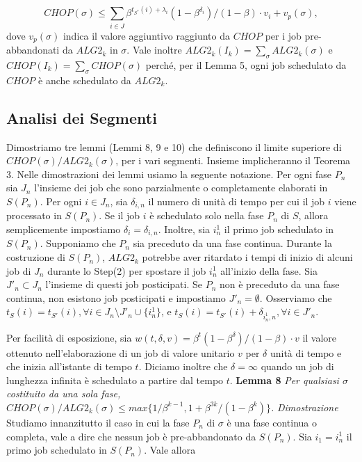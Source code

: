 \documentclass[twoside,openany,titlepage,fleqn,
	headinclude,12pt,a4paper,BCOR5mm,footinclude]{scrbook}
\begin{document}
$$CHOP(\sigma) \leq \sum_{i \in J} \beta^{t_{S^{*}}(i)+\lambda_{i}} (1 - \beta^{\delta_{i}})/(1 - \beta) \cdot v_{i} + v_{p}(\sigma),$$
dove $v_{p}(\sigma)$ indica il valore aggiuntivo raggiunto da $CHOP$ per i job pre-abbandonati da $ALG2_{k}$ in $\sigma$. Vale inoltre $ALG2_{k}(I_{k}) = \sum_{\sigma} ALG2_{k}(\sigma)$ e $CHOP(I_{k}) =\sum_{\sigma}CHOP(\sigma)$ perché, per il Lemma 5, ogni job schedulato da $CHOP$ è anche schedulato da $ALG2_{k}$.

\subsection{Analisi dei Segmenti}
Dimostriamo tre lemmi (Lemmi 8, 9 e 10) che definiscono il limite superiore di $CHOP(\sigma)/ALG2_{k}(\sigma)$, per i vari segmenti. Insieme implicheranno il Teorema 3. Nelle dimostrazioni dei lemmi usiamo la seguente notazione. Per ogni fase $P_{n}$ sia $J_{n}$ l'insieme dei job che sono parzialmente o completamente elaborati in $S(P_{n})$. Per ogni $i \in J_{n}$, sia $\delta_{i,n}$ il numero di unità di tempo per cui il job $i$ viene processato in $S(P_{n})$. Se il job $i$ è schedulato solo nella fase $P_{n}$ di $S$, allora semplicemente impostiamo $\delta_{i} = \delta_{i,n}$. Inoltre, sia $i^{1}_{n}$ il primo job schedulato in $S(P_{n})$. Supponiamo che $P_{n}$ sia preceduto da una fase continua. Durante la costruzione di $S(P_{n})$, $ALG2_{k}$ potrebbe aver ritardato i tempi di inizio di alcuni job di $J_{n}$ durante lo Step(2) per spostare il job $i^{1}_{n}$ all'inizio della fase. Sia $J'_{n} \subset J_{n}$ l'insieme di questi job posticipati. Se $P_{n}$ non è preceduto da una fase continua, non esistono job posticipati e impostiamo $J'_{n} = \emptyset$. Osserviamo che $t_{S}(i) = t_{S'}(i), \forall i \in J_{n} \setminus J'_{n} \cup \{i^{1}_{n}\}$, e $t_{S}(i) = t_{S'}(i) + \delta_{i^{1}_{n},n}, \forall i \in J'_{n}$.

Per facilità di esposizione, sia $w(t, \delta, v) = \beta^{t} (1 - \beta^{\delta}) / (1 - \beta) \cdot v$ il valore ottenuto nell'elaborazione di un job di valore unitario $v$ per $\delta$ unità di tempo e che inizia all'istante di tempo $t$. Diciamo inoltre che $\delta = \infty$ quando un job di lunghezza infinita è schedulato a partire dal tempo $t$.
\newline \newline
\textbf{Lemma 8}
\textit{Per qualsiasi $\sigma$ costituito da una sola fase, $CHOP(\sigma) / ALG2_{k}(\sigma) \leq max \{1 / \beta^{k - 1}, 1 + \beta^{3k} / (1 - \beta^{k})\}$.}
\newline \newline
\textit{Dimostrazione} 
Studiamo innanzitutto il caso in cui la fase $P_{n}$ di $\sigma$ è una fase continua o completa, vale a dire che nessun job è pre-abbandonato da $S(P_{n})$. Sia $i_{1} = i^{1}_{n}$ il primo job schedulato in $S(P_{n})$. Vale allora
\end{document}
